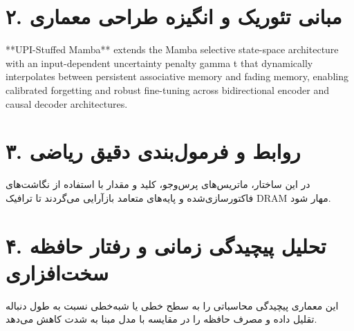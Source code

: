 \documentclass[12pt,a4paper]{article}
\begin{document}
\section*{۲. مبانی تئوریک و انگیزه طراحی معماری}
**UPI-Stuffed Mamba** extends the Mamba selective state-space architecture with an input-dependent uncertainty penalty gamma t that dynamically interpolates between persistent associative memory and fading memory, enabling calibrated forgetting and robust fine-tuning across bidirectional encoder and causal decoder architectures.

\section*{۳. روابط و فرمول‌بندی دقیق ریاضی}
در این ساختار، ماتریس‌های پرس‌وجو، کلید و مقدار با استفاده از نگاشت‌های فاکتورسازی‌شده و پایه‌های متعامد بازآرایی می‌گردند تا ترافیک DRAM مهار شود.

\section*{۴. تحلیل پیچیدگی زمانی و رفتار حافظه سخت‌افزاری}
این معماری پیچیدگی محاسباتی را به سطح خطی یا شبه‌خطی نسبت به طول دنباله تقلیل داده و مصرف حافظه را در مقایسه با مدل مبنا به شدت کاهش می‌دهد.
\end{document}
